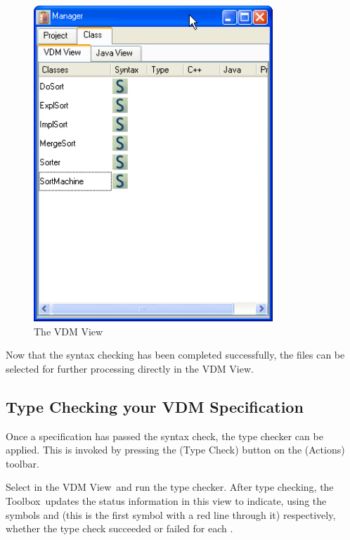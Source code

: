 \documentclass[\pformat,12pt]{article}
\newcommand{\Toolbox}{Toolbox}
\newcommand{\vdmModView}{\guicmd{VDM View}}
\newcommand{\guicmd}[1]{{\sf #1}}
\begin{document}
\begin{figure}[tbh]
\begin{center}
\includegraphics[width=9cm]{vdmViewENG.png}
\caption{The VDM View}
\label{fig:vdmModView}
\end{center}
\end{figure}

Now that the syntax checking has been completed successfully, the
files can be selected for further processing directly in the \vdmModView.

\subsection{Type Checking your VDM Specification}
\label{sec:gde-tc}

Once a specification has passed the syntax check, the type checker
can be applied. This is invoked by pressing the 
(\guicmd{Type Check}) button on the (\guicmd{Actions}) toolbar.

Select  in the \vdmModView\ and run the type 
checker. After type checking, the \Toolbox\ updates the status 
  information in this view to indicate,
using the symbols 
and
(this is the first symbol
with a red line through it) 
respectively, whether the type check succeeded or failed for each
.
\end{document}
